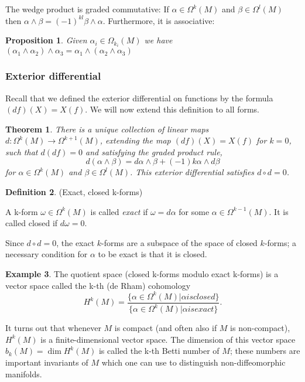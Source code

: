 \documentclass{article}
\newtheorem{theorem}{Theorem}[section]
\newtheorem{proposition}{Proposition}[theorem]
\theoremstyle{definition}
\newtheorem{defn}[theorem]{Definition}
\newtheorem{example}[theorem]{Example}
\newenvironment{definition}
  {\vspace{8pt}\begin{mdframed}[backgroundcolor=blueish]\begin{defn}}
  {\end{defn}\end{mdframed}\vspace{4pt}}
\begin{document}
The wedge product is graded commutative: If $\alpha \in \Omega^k (M)$ and $\beta \in \Omega^l (M)$ then $\alpha \wedge \beta = (-1) ^{kl}\beta \wedge \alpha $. Furthermore, it is associative:

\begin{proposition}
Given $\alpha_i \in \Omega_{k_i} (M)$ we have $(\alpha_1 \wedge \alpha_2)\wedge \alpha_3 = \alpha_1 \wedge (\alpha_2 \wedge \alpha_3)$
\end{proposition}

\subsubsection{Exterior differential}
Recall that we defined the exterior differential on functions by the formula $(d f)(X) = X(f)$. We will now extend this definition to all forms.

\begin{theorem}

There is a unique collection of linear maps $d : \Omega^k (M) \rightarrow \Omega^{k+1} (M)$, extending the map $(d f)(X) = X(f)$ for $k = 0$, such that $d(d f) = 0$ and satisfying the graded product rule, 
\[
    d(\alpha \wedge \beta) = d\alpha \wedge \beta + (-1) k\alpha \wedge d\beta 
\]
for $\alpha \in \Omega^k (M)$ and $\beta \in \Omega^l (M)$. This exterior differential satisfies $d \circ d = 0$.
\end{theorem}

\begin{definition} (Exact, closed k-forms)

A k-form $\omega \in \Omega^k (M)$ is called \textit{exact} if $\omega = d\alpha$ for some $\alpha \in \Omega^{k-1} (M)$. It is called closed if $d\omega = 0$.
\end{definition}

Since $d\circ d = 0$, the exact $k$-forms are a subspace of the space of closed $k$-forms; a necessary condition for $\alpha$ to be exact is that it is closed.

\begin{example}

The quotient space (closed k-forms modulo exact k-forms) is a vector space called the k-th (de Rham) cohomology
\[
H^k (M) = \frac{\{\alpha \in \Omega^k (M)| \alpha is closed \}}{\{\alpha \in \Omega^k(M)| \alpha is exact \}}.
\]

It turns out that whenever $M$ is compact (and often also if $M$ is non-compact), $H ^k (M)$ is a finite-dimensional vector space. The dimension of this vector space $b_k(M) = \dim H^k (M)$ is called the k-th Betti number of $M$; these numbers are important invariants of $M$ which one can use to distinguish non-diffeomorphic manifolds.
\end{example}
\end{document}
